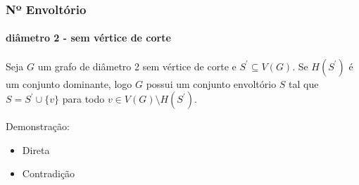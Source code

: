 \begin{frame}
\frametitle{Nº Envoltório}
\framesubtitle{diâmetro 2 - sem vértice de corte}
\begin{lem}
     \label{hs-dominante-envoltorio}
     Seja $G$ um grafo de diâmetro 2 sem vértice de corte e $S^\prime \subseteq V(G)$. Se $H(S^\prime)$ é um conjunto dominante, logo $G$ possui um conjunto envoltório $S$ tal que  $S=S^\prime \cup \{v\}$ para todo $v\in V(G) \setminus H(S^\prime)$.
\end{lem}
Demonstração:
\begin{itemize}
    \item Direta 
    \item Contradição
\end{itemize}


\end{frame}
